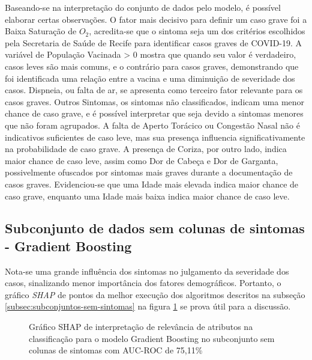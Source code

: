  Baseando-se na interpretação do conjunto de dados pelo modelo, é possível elaborar certas observações. O fator mais decisivo para definir um caso grave foi a Baixa Saturação de $O_2$, acredita-se que o sintoma seja um dos critérios escolhidos pela Secretaria de Saúde de Recife para identificar casos graves de COVID-19. A variável de População Vacinada > 0 mostra que quando seu valor é verdadeiro, casos leves são mais comuns, e o contrário para casos graves, demonstrando que foi identificada uma relação entre a vacina e uma diminuição de severidade dos casos. Dispneia, ou falta de ar, se apresenta como terceiro fator relevante para os casos graves. Outros Sintomas, os sintomas não classificados, indicam uma menor chance de caso grave, e é possível interpretar que seja devido a sintomas menores que não foram agrupados. A falta de Aperto Torácico ou Congestão Nasal não é indicativos suficientes de caso leve, mas sua presença influencia significativamente na probabilidade de caso grave. A presença de Coriza, por outro lado, indica maior chance de caso leve, assim como Dor de Cabeça e Dor de Garganta, possivelmente ofuscados por sintomas mais graves durante a documentação de casos graves. Evidenciou-se que uma Idade mais elevada indica maior chance de caso grave, enquanto uma Idade mais baixa indica maior chance de caso leve.

 \subsection{Subconjunto de dados sem colunas de sintomas - Gradient Boosting}
 \label{subsec:gb-sem-sintomas}

 Nota-se uma grande influência dos sintomas no julgamento da severidade dos casos, sinalizando menor importância dos fatores demográficos. Portanto, o gráfico \textit{SHAP} de pontos da melhor execução dos algoritmos descritos na subseção \ref{subsec:subconjuntos-sem-sintomas} na figura \ref{fig:xgboost-sem-sintomas} se prova útil para a discussão.

 \begin{figure}[ht!]
  \centering
  \caption{\textmd{Gráfico SHAP de interpretação de relevância de atributos na classificação para o modelo Gradient Boosting no subconjunto sem colunas de sintomas com AUC-ROC de 75,11\%}}
  \label{fig:xgboost-sem-sintomas}
\end{figure}

